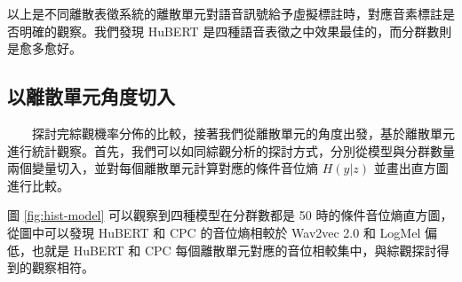         以上是不同離散表徵系統的離散單元對語音訊號給予虛擬標註時，對應音素標註是否明確的觀察。我們發現 HuBERT 是四種語音表徵之中效果最佳的，而分群數則是愈多愈好。

\subsection{以離散單元角度切入}  %

　　探討完綜觀機率分佈的比較，接著我們從離散單元的角度出發，基於離散單元進行統計觀察。首先，我們可以如同綜觀分析的探討方式，分別從模型與分群數量兩個變量切入，並對每個離散單元計算對應的條件音位熵 $H(y|z)$ 並畫出直方圖進行比較。

圖 \ref{fig:hist-model} 可以觀察到四種模型在分群數都是 50 時的條件音位熵直方圖，從圖中可以發現 HuBERT 和 CPC 的音位熵相較於 Wav2vec 2.0 和 LogMel 偏低，也就是 HuBERT 和 CPC 每個離散單元對應的音位相較集中，與綜觀探討得到的觀察相符。
